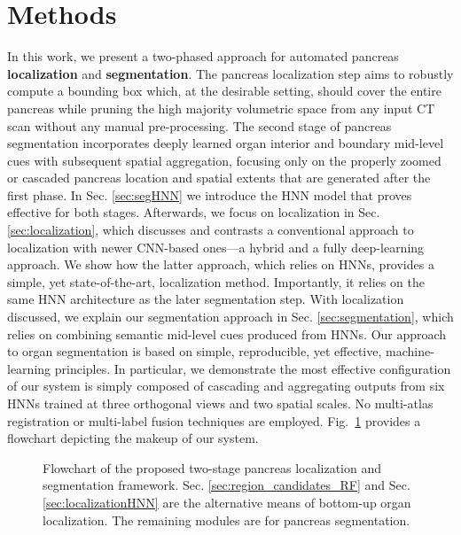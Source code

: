 \documentclass[journal]{IEEEtran}
\def \Npatients {82}
\begin{document}
\section{Methods}\label{sec:methods}
In this work, we present a two-phased approach for automated pancreas \textbf{localization} and \textbf{segmentation}. The pancreas localization step aims to robustly compute a bounding box which, at the desirable setting, should cover the entire pancreas while pruning the high majority volumetric space from any input CT scan without any manual pre-processing. The second stage of pancreas segmentation incorporates deeply learned organ interior and boundary mid-level cues with subsequent spatial aggregation, focusing only on the properly zoomed or cascaded pancreas location and spatial extents that are generated after the first phase. 
In Sec. \ref{sec:segHNN} we introduce the HNN model that proves effective for both stages. Afterwards, we focus on localization in Sec. \ref{sec:localization}, which discusses and contrasts a conventional approach to localization with newer CNN-based ones---a hybrid and a fully deep-learning approach. We show how the latter approach, which relies on HNNs, provides a simple, yet state-of-the-art, localization method. Importantly, it relies on the same HNN architecture as the later segmentation step. With localization discussed, we explain our segmentation approach in Sec. \ref{sec:segmentation}, which relies on combining semantic mid-level cues produced from HNNs. Our approach to organ segmentation is based on simple, reproducible, yet effective, machine-learning principles. In particular, we demonstrate the most effective configuration of our system is simply composed of cascading and aggregating outputs from six HNNs trained at three orthogonal views and two spatial scales. No multi-atlas registration or multi-label fusion techniques are employed. Fig.~\ref{fig:flowchart} provides a flowchart depicting the makeup of our system.
\begin{figure}[htb]%
\centering	
	\caption{\small Flowchart of the proposed two-stage pancreas localization and segmentation framework. Sec. \ref{sec:region_candidates_RF} and Sec. \ref{sec:localizationHNN} are the alternative means of bottom-up organ localization. The remaining modules are for pancreas segmentation.}
	\label{fig:flowchart}
\end{figure}
\end{document}
